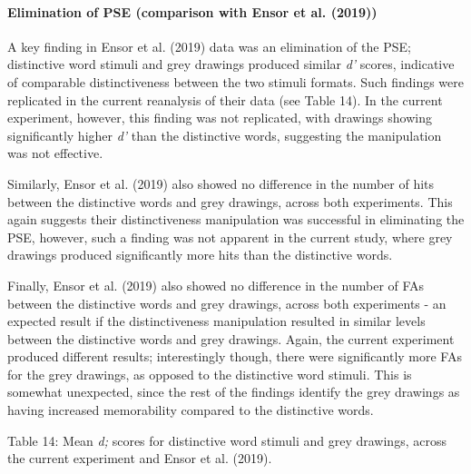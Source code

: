 \documentclass[
  11pt,
]{article}
\begin{document}
\newpage

\hypertarget{elimination-of-pse-comparison-with-ensor2019b}{%
\paragraph{Elimination of PSE (comparison with Ensor et al.
(2019))}\label{elimination-of-pse-comparison-with-ensor2019b}}

A key finding in Ensor et al. (2019) data was an elimination of the PSE;
distinctive word stimuli and grey drawings produced similar \emph{d'}
scores, indicative of comparable distinctiveness between the two stimuli
formats. Such findings were replicated in the current reanalysis of
their data (see Table 14). In the current experiment, however, this
finding was not replicated, with drawings showing significantly higher
\emph{d'} than the distinctive words, suggesting the manipulation was
not effective.

Similarly, Ensor et al. (2019) also showed no difference in the number
of hits between the distinctive words and grey drawings, across both
experiments. This again suggests their distinctiveness manipulation was
successful in eliminating the PSE, however, such a finding was not
apparent in the current study, where grey drawings produced
significantly more hits than the distinctive words.

Finally, Ensor et al. (2019) also showed no difference in the number of
FAs between the distinctive words and grey drawings, across both
experiments - an expected result if the distinctiveness manipulation
resulted in similar levels between the distinctive words and grey
drawings. Again, the current experiment produced different results;
interestingly though, there were significantly more FAs for the grey
drawings, as opposed to the distinctive word stimuli. This is somewhat
unexpected, since the rest of the findings identify the grey drawings as
having increased memorability compared to the distinctive words.

Table 14: Mean \emph{d;} scores for distinctive word stimuli and grey
drawings, across the current experiment and Ensor et al. (2019).
\begingroup\fontsize{10}{12}\selectfont
\end{document}
